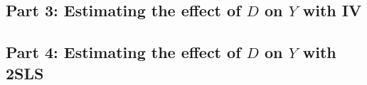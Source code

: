 \documentclass[
  letterpaper,
  DIV=11,
  numbers=noendperiod]{scrartcl}
\begin{document}
\subsection{\texorpdfstring{Part 3: Estimating the effect of \(D\) on
\(Y\) with
IV}{Part 3: Estimating the effect of D on Y with IV}}\label{part-3-estimating-the-effect-of-d-on-y-with-iv}

\subsection{\texorpdfstring{Part 4: Estimating the effect of \(D\) on
\(Y\) with
2SLS}{Part 4: Estimating the effect of D on Y with 2SLS}}\label{part-4-estimating-the-effect-of-d-on-y-with-2sls}
\end{document}
